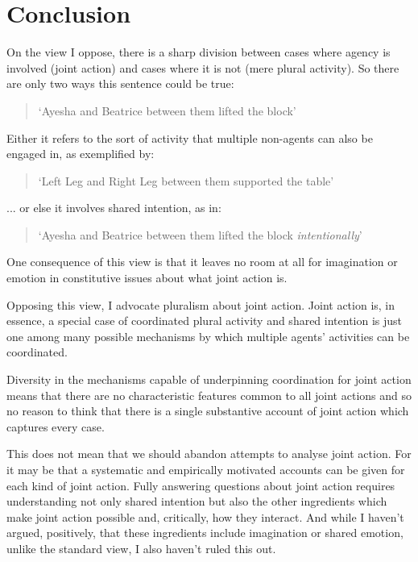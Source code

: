 \documentclass[12pt,a4paper]{extarticle}
\begin{document}
\section{Conclusion}
On the view I oppose, there is a sharp division between cases where agency is involved (joint action) and cases where it is not (mere plural activity).  
So there are only two ways this sentence could be true:
\begin{quote}
`Ayesha and Beatrice between them lifted the block'
\end{quote}
Either it refers to the sort of activity that multiple non-agents can also be engaged in, as exemplified by:
\begin{quote}
`Left Leg and Right Leg between them supported the table'
\end{quote}
... or else it involves shared intention, as in:
\begin{quote}
`Ayesha and Beatrice between them lifted the block  \emph{intentionally}'
\end{quote}
One consequence of this view is that it leaves no room at all for imagination or emotion in constitutive issues about what joint action is. 



Opposing this view, I advocate pluralism about joint action.  Joint action is, in essence, a special case of coordinated plural activity
 and shared intention is just one among many possible mechanisms by which multiple agents' activities can be coordinated.

Diversity in the mechanisms capable of underpinning coordination for joint action means that there are no characteristic features common to all joint actions and so no reason to think that there is a single substantive account of joint action which captures every case.  

This does not mean that we should abandon attempts to analyse joint action.  For it may be that a systematic and empirically motivated accounts can be given for each kind of joint action.  
Fully answering questions about joint action requires understanding not only shared intention but also the other ingredients which make joint action possible and, critically, how they interact.  And while I haven't argued, positively, that these ingredients include imagination or shared emotion, unlike the standard view, I also haven't ruled this out.




\singlespacing

\end{document}
